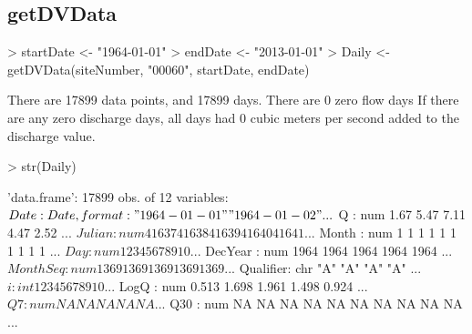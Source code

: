 \documentclass[a4paper,11pt]{article}
\begin{document}
\subsection{getDVData}
\begin{Schunk}
\begin{Sinput}
> startDate <- "1964-01-01"
> endDate <- "2013-01-01"
> Daily <- getDVData(siteNumber, "00060", startDate, endDate)
\end{Sinput}
\begin{Soutput}
There are  17899 data points, and  17899 days.
There are  0 zero flow days
If there are any zero discharge days, all days had 0 cubic meters per second added to the discharge value.
\end{Soutput}
\begin{Sinput}
> str(Daily)
\end{Sinput}
\begin{Soutput}
'data.frame':	17899 obs. of  12 variables:
 $ Date     : Date, format: "1964-01-01" "1964-01-02" ...
 $ Q        : num  1.67 5.47 7.11 4.47 2.52 ...
 $ Julian   : num  41637 41638 41639 41640 41641 ...
 $ Month    : num  1 1 1 1 1 1 1 1 1 1 ...
 $ Day      : num  1 2 3 4 5 6 7 8 9 10 ...
 $ DecYear  : num  1964 1964 1964 1964 1964 ...
 $ MonthSeq : num  1369 1369 1369 1369 1369 ...
 $ Qualifier: chr  "A" "A" "A" "A" ...
 $ i        : int  1 2 3 4 5 6 7 8 9 10 ...
 $ LogQ     : num  0.513 1.698 1.961 1.498 0.924 ...
 $ Q7       : num  NA NA NA NA NA ...
 $ Q30      : num  NA NA NA NA NA NA NA NA NA NA ...
\end{Soutput}
\end{Schunk}

\end{document}
